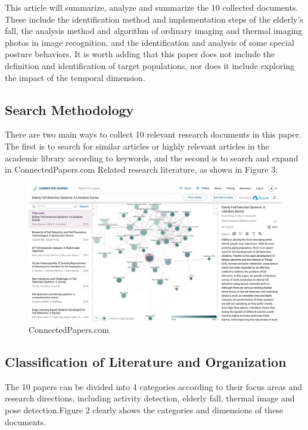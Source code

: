 \documentclass[12pt]{article}
\begin{document}
This article will summarize, analyze and summarize the 10 collected documents. These include the identification method and implementation steps of the elderly's fall, the analysis method and algorithm of ordinary imaging and thermal imaging photos in image recognition, and the identification and analysis of some special posture behaviors. It is worth adding that this paper does not include the definition and identification of target populations, nor does it include exploring the impact of the temporal dimension.

\subsection{Search Methodology}

There are two main ways to collect 10 relevant research documents in this paper. The first is to search for similar articles or highly relevant articles in the academic library according to keywords, and the second is to search and expand in ConnectedPapers.com Related research literature, as shown in Figure 3:

\begin{figure}[H]
\centering
\includegraphics[width=1\textwidth]{connected-paper.pic.jpg}
\caption{ConnectedPapers.com} 
\end{figure}

\subsection{Classification of Literature and Organization}

The 10 papers can be divided into 4 categories according to their focus areas and research directions, including activity detection, elderly fall, thermal image and pose detection.Figure 2 clearly shows the categories and dimensions of these documents.
\end{document}
